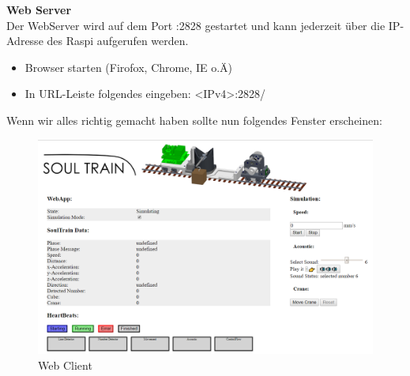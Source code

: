 \documentclass[../../main.tex]{subfiles}
\begin{document}
\textbf{Web Server}\\
Der WebServer wird auf dem Port :2828 gestartet und kann jederzeit über die IP-Adresse des Raspi aufgerufen werden.
\begin{itemize}
    \item Browser starten (Firofox, Chrome, IE o.Ä)
    \item In URL-Leiste folgendes eingeben: <IPv4>:2828/
\end{itemize}

Wenn wir alles richtig gemacht haben sollte nun folgendes Fenster erscheinen:
\begin{figure}[H] \centering
    \includegraphics[width=1\textwidth]{HomeWebApp}
    \caption{Web Client}
    \label{fig:Home}
\end{figure}
\end{document}
